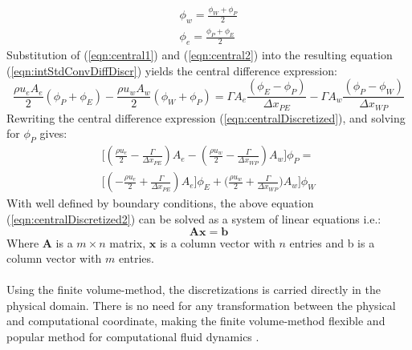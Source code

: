 \documentclass[a4paper, 12pt]{report}
\begin{document}
\begin{eqnarray}
\label{eqn:central1}
\phi_w = \frac{\phi_W + \phi_P}{2} \\ 
\label{eqn:central2}
\phi_e = \frac{\phi_P + \phi_E}{2} 
\end{eqnarray}
Substitution of (\ref{eqn:central1}) and (\ref{eqn:central2}) into the resulting equation (\ref{eqn:intStdConvDiffDiscr}) yields the central difference expression:
\begin{equation}
\frac{\rho u_e A_e}{2} (\phi_P + \phi_E) - \frac{\rho u_w A_w}{2} (\phi_W + \phi_P) = \Gamma A_e \frac{(\phi_E - \phi_P)}{\Delta x_{PE}} - \Gamma A_w \frac{(\phi_P - \phi_W)}{\Delta x_{WP}}
\label{eqn:centralDiscretized}
\end{equation}
Rewriting the central difference expression (\ref{eqn:centralDiscretized}), and solving for  $\phi_P$ gives:
\begin{eqnarray}
\Big[(\frac{\rho u_e}{2} - \frac{\Gamma}{\Delta x_{PE}} )A_e  - (\frac{\rho u_w}{2} - \frac{\Gamma}{\Delta x_{WP}} )A_w \Big]\phi_P = \nonumber \\ 
\Big[(- \frac{\rho u_e}{2} + \frac{\Gamma}{\Delta x_{PE}})A_e\Big]\phi_E + \Big(\frac{\rho u_w}{2} + \frac{\Gamma}{\Delta x_{WP}} )A_w \Big]\phi_W
\label{eqn:centralDiscretized2}
\end{eqnarray}
With well defined by boundary conditions, the above equation (\ref{eqn:centralDiscretized2}) can be solved as a system of linear equations i.e.:
\begin{equation}
\mathbf{A}\mathbf{x}=\mathbf{b}
\label{eqn:sysOfLinearEqn}
\end{equation}
Where $\mathbf{A}$ is a $m \times n$ matrix, $\mathbf{x}$ is a column vector with $n$ entries and b is a column vector with $m$ entries.\\
\\
Using the finite volume-method, the discretizations is carried directly in the physical domain. There is no need for any transformation between the physical and computational coordinate, making the finite volume-method flexible and popular method for computational fluid dynamics \cite{CFDOpenFOAM}.
\end{document}
